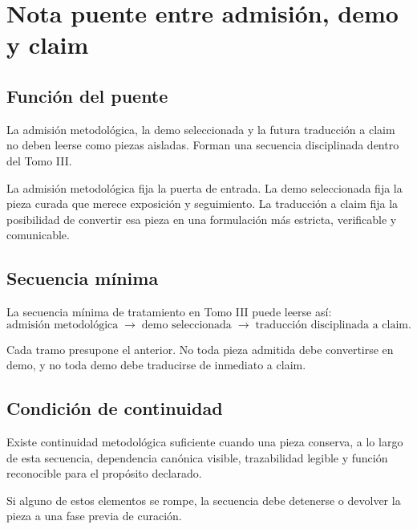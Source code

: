 \chapter{Nota puente entre admisión, demo y claim}

\section{Función del puente}
\begin{observation}
La admisión metodológica, la demo seleccionada y la futura traducción a claim no deben leerse como piezas aisladas. Forman una secuencia disciplinada dentro del Tomo III.
\end{observation}

\begin{observation}
La admisión metodológica fija la puerta de entrada. La demo seleccionada fija la pieza curada que merece exposición y seguimiento. La traducción a claim fija la posibilidad de convertir esa pieza en una formulación más estricta, verificable y comunicable.
\end{observation}

\section{Secuencia mínima}
\begin{definition}
La secuencia mínima de tratamiento en Tomo III puede leerse así:
\[
\text{admisión metodológica}
\;\longrightarrow\;
\text{demo seleccionada}
\;\longrightarrow\;
\text{traducción disciplinada a claim}.
\]
\end{definition}

\begin{observation}
Cada tramo presupone el anterior. No toda pieza admitida debe convertirse en demo, y no toda demo debe traducirse de inmediato a claim.
\end{observation}

\section{Condición de continuidad}
\begin{definition}
Existe continuidad metodológica suficiente cuando una pieza conserva, a lo largo de esta secuencia, dependencia canónica visible, trazabilidad legible y función reconocible para el propósito declarado.
\end{definition}

\begin{observation}
Si alguno de estos elementos se rompe, la secuencia debe detenerse o devolver la pieza a una fase previa de curación.
\end{observation}

